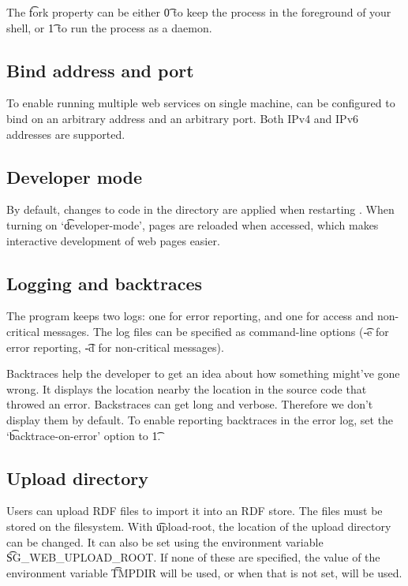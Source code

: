   The \t{fork} property can be either \t{0} to keep the
   process in the foreground of your shell, or
  \t{1} to run the  process as a daemon.

\subsection{Bind address and port}

  To enable running multiple web services on single machine, 
  can be configured to bind on an arbitrary address and an arbitrary port.
  Both IPv4 and IPv6 addresses are supported.

\subsection{Developer mode}

  By default, changes to code in the  directory are
  applied when restarting .  When turning on
  `\t{developer-mode}', pages are reloaded when accessed, which makes
  interactive development of web pages easier.

\subsection{Logging and backtraces}
\label{sec:logging}

  The  program keeps two logs: one for error reporting, and
  one for access and non-critical messages.  The log files can be specified
  as command-line options (\t{-e} for error reporting, \t{-d} for
  non-critical messages).

  Backtraces help the developer to get an idea about how something might've
  gone wrong.  It displays the location nearby the location in the source code
  that throwed an error.  Backstraces can get long and verbose.  Therefore we
  don't display them by default.  To enable reporting backtraces in the error
  log, set the `\t{backtrace-on-error}' option to \t{1}.

\subsection{Upload directory}

  Users can upload RDF files to import it into an RDF store.  The files must
  be stored on the filesystem.  With \t{upload-root}, the location of
  the upload directory can be changed.  It can also be set using the
  environment variable \t{SG\_WEB\_UPLOAD\_ROOT}.  If none of these are
  specified, the value of the environment variable \t{TMPDIR} will be
  used, or when that is not set,  will be used.

